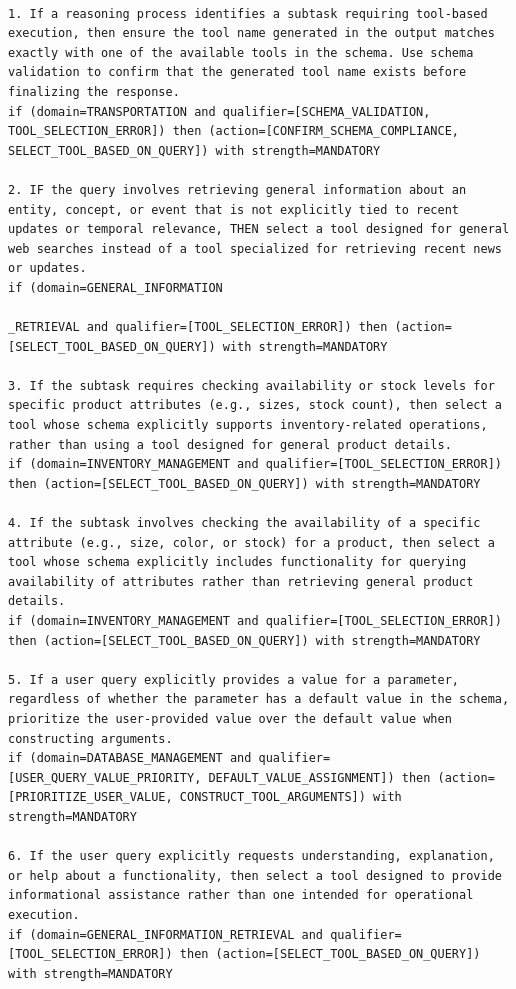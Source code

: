 \begin{lstlisting}[style=rulestyle, caption={Sample rules learned from the BFCL: Live-Multiple dataset}]

1. If a reasoning process identifies a subtask requiring tool-based execution, then ensure the tool name generated in the output matches exactly with one of the available tools in the schema. Use schema validation to confirm that the generated tool name exists before finalizing the response.
if (domain=TRANSPORTATION and qualifier=[SCHEMA_VALIDATION, TOOL_SELECTION_ERROR]) then (action=[CONFIRM_SCHEMA_COMPLIANCE, SELECT_TOOL_BASED_ON_QUERY]) with strength=MANDATORY

2. IF the query involves retrieving general information about an entity, concept, or event that is not explicitly tied to recent updates or temporal relevance, THEN select a tool designed for general web searches instead of a tool specialized for retrieving recent news or updates.
if (domain=GENERAL_INFORMATION

_RETRIEVAL and qualifier=[TOOL_SELECTION_ERROR]) then (action=[SELECT_TOOL_BASED_ON_QUERY]) with strength=MANDATORY

3. If the subtask requires checking availability or stock levels for specific product attributes (e.g., sizes, stock count), then select a tool whose schema explicitly supports inventory-related operations, rather than using a tool designed for general product details.
if (domain=INVENTORY_MANAGEMENT and qualifier=[TOOL_SELECTION_ERROR]) then (action=[SELECT_TOOL_BASED_ON_QUERY]) with strength=MANDATORY

4. If the subtask involves checking the availability of a specific attribute (e.g., size, color, or stock) for a product, then select a tool whose schema explicitly includes functionality for querying availability of attributes rather than retrieving general product details.
if (domain=INVENTORY_MANAGEMENT and qualifier=[TOOL_SELECTION_ERROR]) then (action=[SELECT_TOOL_BASED_ON_QUERY]) with strength=MANDATORY

5. If a user query explicitly provides a value for a parameter, regardless of whether the parameter has a default value in the schema, prioritize the user-provided value over the default value when constructing arguments.
if (domain=DATABASE_MANAGEMENT and qualifier=[USER_QUERY_VALUE_PRIORITY, DEFAULT_VALUE_ASSIGNMENT]) then (action=[PRIORITIZE_USER_VALUE, CONSTRUCT_TOOL_ARGUMENTS]) with strength=MANDATORY

6. If the user query explicitly requests understanding, explanation, or help about a functionality, then select a tool designed to provide informational assistance rather than one intended for operational execution.
if (domain=GENERAL_INFORMATION_RETRIEVAL and qualifier=[TOOL_SELECTION_ERROR]) then (action=[SELECT_TOOL_BASED_ON_QUERY]) with strength=MANDATORY


\end{lstlisting}
